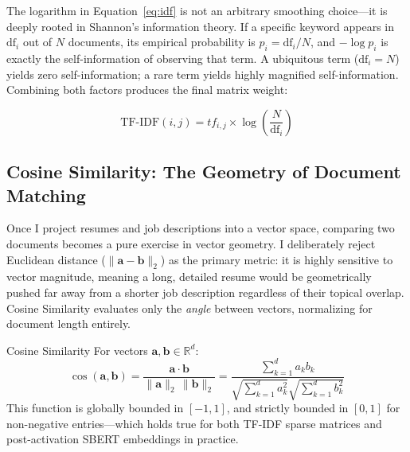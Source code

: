 \vspace{0.5em}

The logarithm in Equation~\eqref{eq:idf} is not an arbitrary smoothing choice---it is deeply rooted in Shannon's information theory. If a specific keyword appears in $\text{df}_i$ out of $N$ documents, its empirical probability is $p_i = \text{df}_i/N$, and $-\log p_i$ is exactly the self-information of observing that term. A ubiquitous term ($\text{df}_i = N$) yields zero self-information; a rare term yields highly magnified self-information. Combining both factors produces the final matrix weight:

\begin{equation}
\text{TF-IDF}(i,j) = tf_{i,j} \times \log\!\left(\frac{N}{\text{df}_i}\right)
\label{eq:tfidf}
\end{equation}

\subsection{Cosine Similarity: The Geometry of Document Matching}

Once I project resumes and job descriptions into a vector space, comparing two documents becomes a pure exercise in vector geometry. I deliberately reject Euclidean distance ($\lVert \mathbf{a} - \mathbf{b} \rVert_2$) as the primary metric: it is highly sensitive to vector magnitude, meaning a long, detailed resume would be geometrically pushed far away from a shorter job description regardless of their topical overlap. Cosine Similarity evaluates only the \emph{angle} between vectors, normalizing for document length entirely.

\begin{definitionbox}{Cosine Similarity}
For vectors $\mathbf{a}, \mathbf{b} \in \mathbb{R}^d$:
\begin{equation}
\cos(\mathbf{a}, \mathbf{b}) = \frac{\mathbf{a} \cdot \mathbf{b}}{\lVert \mathbf{a} \rVert_2 \, \lVert \mathbf{b} \rVert_2} = \frac{\sum_{k=1}^{d} a_k b_k}{\sqrt{\sum_{k=1}^{d} a_k^2}\sqrt{\sum_{k=1}^{d} b_k^2}}
\label{eq:cosine_sim}
\end{equation}
This function is globally bounded in $[-1,1]$, and strictly bounded in $[0,1]$ for non-negative entries---which holds true for both TF-IDF sparse matrices and post-activation SBERT embeddings in practice.
\end{definitionbox}

\vspace{0.5em}


